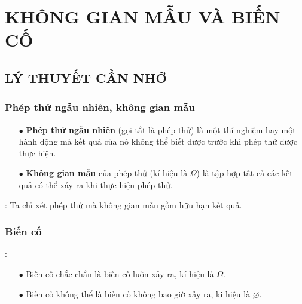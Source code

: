 \section{KHÔNG GIAN MẪU VÀ BIẾN CỐ}
\subsection{LÝ THUYẾT CẦN NHỚ}
\subsubsection{Phép thử ngẫu nhiên, không gian mẫu}
	\begin{itemize}
		\item [$\bullet$]  \textbf{Phép thử ngẫu nhiên} (gọi tắt là phép thử) là một thí nghiệm hay một hành động mà kết quả của nó không thể biết được trước khi phép thử được thực hiện.
		\item [$\bullet$]  \textbf{Không gian mẫu} của phép thử (kí hiệu là $\Omega$) là tập hợp tất cả các kết quả có thể xảy ra khi thực hiện phép thử.
	\end{itemize}
: Ta chỉ xét phép thử mà không gian mẫu gồm hữu hạn kết quả.
\subsubsection{Biến cố}
: 
\begin{itemize}
	\item [$\bullet$] Biến cố chắc chắn là biến cố luôn xảy ra, kí hiệu là $\Omega$.
	\item [$\bullet$] Biến cố không thể là biến cố không bao giờ xảy ra, ki hiệu là $\varnothing$.
\end{itemize}
